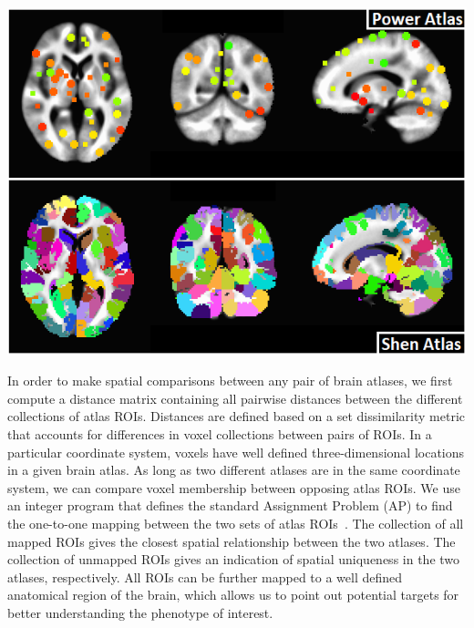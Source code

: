 \documentclass[10pt,letterpaper]{article}\usepackage[]{graphicx}\usepackage[]{color}
\begin{document}
{\centering
	\begin{minipage}[c]{0.55\textwidth}
		\includegraphics[width=1\textwidth,clip,trim=0cm 0cm 0cm 0.0cm]{power_shen_montage2.png}
	\end{minipage}\hfill
	\begin{minipage}[c]{0.43\textwidth}
		\captionsetup{type=figure}\label{fig:power_shen_unmapped}
\end{minipage}}

\vspace{0.25cm}

In order to make spatial comparisons between any pair of brain atlases, we first compute a distance matrix containing all pairwise distances between the different collections of atlas ROIs. Distances are defined based on a set dissimilarity metric that accounts for differences in voxel collections between pairs of ROIs. In a particular coordinate system, voxels have well defined three-dimensional locations in a given brain atlas. As long as two different atlases are in the same coordinate system, we can compare voxel membership between opposing atlas ROIs. We use an integer program that defines the standard Assignment Problem (AP) to find the one-to-one mapping between the two sets of atlas ROIs~\cite{pentico2007}. The collection of all mapped ROIs gives the closest spatial relationship between the two atlases. The collection of unmapped ROIs gives an indication of spatial uniqueness in the two atlases, respectively. All ROIs can be further mapped to a well defined anatomical region of the brain, which allows us to point out potential targets for better understanding the phenotype of interest.
\end{document}

